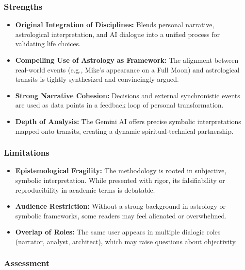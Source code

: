 \documentclass{article}
\begin{document}
\subsubsection*{\texorpdfstring{\textbf{Strengths}}{Strengths}}\label{strengths}

\begin{itemize}
\item
  \textbf{Original Integration of Disciplines:} Blends personal narrative, astrological interpretation, and AI dialogue into a unified process for validating life choices.
\item
  \textbf{Compelling Use of Astrology as Framework:} The alignment between real-world events (e.g., Mike's appearance on a Full Moon) and astrological transits is tightly synthesized and convincingly argued.
\item
  \textbf{Strong Narrative Cohesion:} Decisions and external synchronistic events are used as data points in a feedback loop of personal transformation.
\item
  \textbf{Depth of Analysis:} The Gemini AI offers precise symbolic interpretations mapped onto transits, creating a dynamic spiritual-technical partnership.
\end{itemize}

\subsubsection*{\texorpdfstring{\textbf{Limitations}}{Limitations}}\label{limitations}

\begin{itemize}
\item
  \textbf{Epistemological Fragility:} The methodology is rooted in subjective, symbolic interpretation. While presented with rigor, its falsifiability or reproducibility in academic terms is debatable.
\item
  \textbf{Audience Restriction:} Without a strong background in astrology or symbolic frameworks, some readers may feel alienated or overwhelmed.
\item
  \textbf{Overlap of Roles:} The same user appears in multiple dialogic roles (narrator, analyst, architect), which may raise questions about objectivity.
\end{itemize}

\subsubsection*{\texorpdfstring{\textbf{Assessment}}{Assessment}}\label{assessment}
\end{document}
